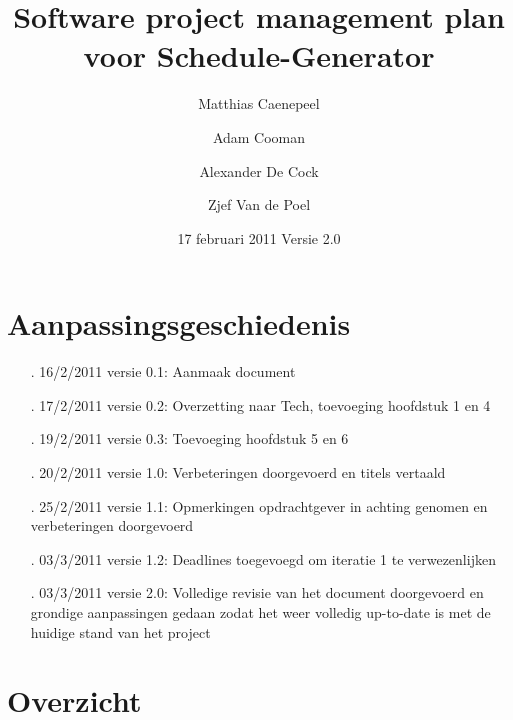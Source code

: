 \documentclass{article}
\title{Software project management plan voor Schedule-Generator}
\author{Matthias Caenepeel \and Adam Cooman \and Alexander De Cock \and Zjef Van de Poel}
\date{17 februari 2011 Versie 2.0}
\begin{document}
\maketitle

\newpage


\newpage


\newpage

\section*{Aanpassingsgeschiedenis}
\begin{itemize}
\item[.] 16/2/2011 versie 0.1: Aanmaak document \\[-3mm]
\item[.] 17/2/2011 versie 0.2: Overzetting naar Tech, toevoeging hoofdstuk 1 en 4\\[-3mm]
\item[.] 19/2/2011 versie 0.3: Toevoeging hoofdstuk 5 en 6\\[-3mm]
\item[.] 20/2/2011 versie 1.0: Verbeteringen doorgevoerd en titels vertaald\\[-3mm]
\item[.] 25/2/2011 versie 1.1: Opmerkingen opdrachtgever in achting genomen en verbeteringen doorgevoerd\\[-3mm]
\item[.] 03/3/2011 versie 1.2: Deadlines toegevoegd om iteratie 1 te verwezenlijken \\[-3mm]
\item[.] 03/3/2011 versie 2.0: Volledige revisie van het document doorgevoerd en grondige aanpassingen gedaan zodat het weer volledig up-to-date is met de huidige stand van het project \\[-3mm]
\end{itemize}


\newpage
\tableofcontents

\newpage
\section{Overzicht}

\end{document}
